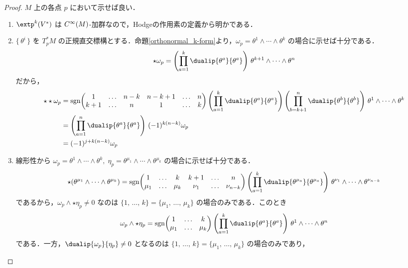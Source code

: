 \documentclass[geometry_main]{subfiles}
\begin{document}
\begin{proof} 
	$M$ 上の各点 $p$ において示せば良い．
	\begin{enumerate} 
		\item $\extp^k(V^*)$ は $C^\infty(M)$-加群なので，Hodgeの作用素の定義から明かである．
		\item $\{\, \theta^i\, \}$ を $T_p^*M$ の正規直交標構とする．命題\ref{orthonormal_k-form}より，$\omega_p = \theta^1 \wedge \cdots \wedge \theta^k$ の場合に示せば十分である．
		\begin{align} 
			\star \omega_p = \left(\prod_{a=1}^k \dualip{\theta^a}{\theta^a} \right)\, \theta^{k+1} \wedge \cdots \wedge \theta^n
		\end{align}
		だから，
		\begin{align} 
			\star \star \omega_p &= \mathrm{sgn} \mqty(1 & \dots & n-k & n-k+1 & \dots & n \\ k+1 & \dots & n & 1 & \dots & k) \left(\prod_{a=1}^k \dualip{\theta^a}{\theta^a}\right) \left(\prod_{b=k+1}^{n} \dualip{\theta^b}{\theta^b}\right)\, \theta^{1} \wedge \cdots \wedge \theta^k  \\
			&= \left(\prod_{a=1}^n \dualip{\theta^a}{\theta^a}\right)\, (-1)^{k(n-k)} \omega_p \\
			&= (-1)^{j + k(n-k)} \omega_p
		\end{align}
		\item 線形性から $\omega_p = \theta^{1} \wedge \cdots \wedge \theta^{k},\; \eta_p = \theta^{\mu_1} \wedge \cdots \wedge \theta^{\mu_k}$ の場合に示せば十分である．
		\begin{align} 
			\star(\theta^{\mu_1} \wedge \cdots \wedge \theta^{\mu_k}) = \mathrm{sgn} \mqty(1 & \dots & k & k+1 & \dots & n \\ \mu_1 & \dots & \mu_k & \nu_1 & \dots & \nu_{n-k}) \left(\prod_{a=1}^k \dualip{\theta^{\mu_a}}{\theta^{\mu_a}}\right)\, \theta^{\nu_1} \wedge \cdots \wedge \theta^{\nu_{n-k}}
		\end{align}
		であるから，$\omega_p \wedge \star \eta_p \neq 0$ なのは $\{1,\, \dots ,\, k\} = \{\mu_1,\, \dots ,\, \mu_k\}$ の場合のみである．このとき
		\begin{align} 
			\omega_p \wedge \star \eta_p = \mathrm{sgn}\mqty(1 & \dots & k \\ \mu_1 & \dots & \mu_k) \left(\prod_{a=1}^k \dualip{\theta^a}{\theta^a}\right)\, \theta^1 \wedge \cdots \wedge \theta^n
		\end{align}
		である．一方，$\dualip{\omega_p}{\eta_p} \neq 0$ となるのは $\{1,\, \dots ,\, k\} = \{\mu_1,\, \dots ,\, \mu_k\}$ の場合のみであり，

\end{enumerate}
\end{proof}
\end{document}

